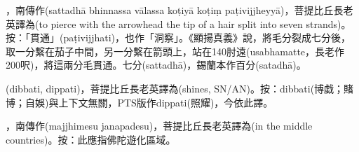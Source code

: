 \startitemgroup[noteitems]
\item{}，南傳作(sattadhā bhinnassa vālassa koṭiyā koṭiṃ paṭivijjheyyā)，菩提比丘長老英譯為(to pierce with the arrowhead the tip of a hair split into seven strands)。按：「貫通」(paṭivijjhati)，也作「洞察」。《顯揚真義》說，將毛分裂成七分後，取一分繫在茄子中間，另一分繫在箭頭上，站在140肘遠(usabhamatte，長老作200呎)，將這兩分毛貫通。七分(sattadhā)，錫蘭本作百分(satadhā)。
\stopitemgroup

\startitemgroup[noteitems]
\item{}(dibbati, dippati)，菩提比丘長老英譯為(shines, SN/AN)。按：dibbati(博戱；賭博；自娛)與上下文無關，PTS版作dippati(照耀)，今依此譯。
\stopitemgroup

\startitemgroup[noteitems]
\item{}，南傳作(majjhimesu janapadesu)，菩提比丘長老英譯為(in the middle countries)。按：此應指佛陀遊化區域。
\stopitemgroup

